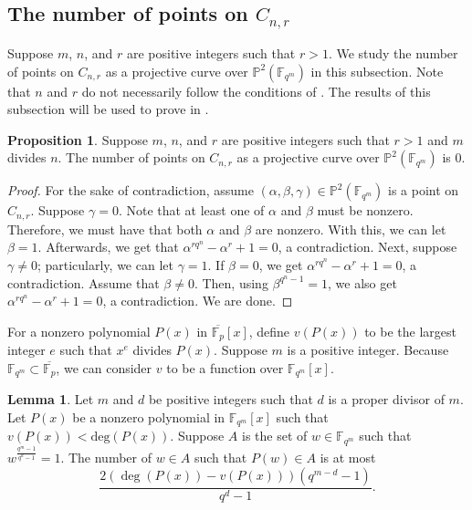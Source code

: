 \documentclass[12pt,letterpaper]{amsart}
\theoremstyle{definition}
\newtheorem{lemma}[theorem]{Lemma}
\newtheorem{proposition}[theorem]{Proposition}
\begin{document}
\subsection{The number of points on \texorpdfstring{$C_{n,r}$}{}}
\label{subsec:numpoints} 

Suppose $m$, $n$, and $r$ are positive integers such that $r>1$. We study the number of points on $C_{n,r}$ as a projective curve over $\mathbb{P}^2(\mathbb{F}_{q^m})$ in this subsection. Note that $n$ and $r$ do not necessarily follow the conditions of . The results of this subsection will be used to prove  in .

\begin{proposition}
\label{prop:numpoints1}
Suppose $m$, $n$, and $r$ are positive integers such that $r>1$ and $m$ divides $n$. The number of points on $C_{n,r}$ as a projective curve over $\mathbb{P}^2(\mathbb{F}_{q^m})$ is $0$.
\end{proposition}

\begin{proof}
For the sake of contradiction, assume $(\alpha,\beta,\gamma)\in \mathbb{P}^2(\mathbb{F}_{q^m})$ is a point on $C_{n,r}$. Suppose $\gamma=0$. Note that at least one of $\alpha$ and $\beta$ must be nonzero. Therefore, we must have that both $\alpha$ and $\beta$ are nonzero. With this, we can let $\beta=1$. Afterwards, we get that $\alpha^{rq^n}-\alpha^r+1=0$, a contradiction. Next, suppose $\gamma\not=0$; particularly, we can let $\gamma=1$. If $\beta=0$, we get $\alpha^{rq^n}-\alpha^r+1=0$, a contradiction. Assume that $\beta\not=0$. Then, using $\beta^{q^n-1}=1$, we also get $\alpha^{rq^n}-\alpha^r+1=0$, a contradiction. We are done.
\end{proof}

For a nonzero polynomial $P(x)$ in $\overline{\mathbb{F}_p}[x]$, define $v(P(x))$ to be the largest integer $e$ such that $x^e$ divides $P(x)$. Suppose $m$ is a positive integer. Because $\mathbb{F}_{q^m}\subset\overline{\mathbb{F}_p}$, we can consider $v$ to be a function over $\mathbb{F}_{q^m}[x]$.

\begin{lemma}
\label{lemma:polynumpoints}
Let $m$ and $d$ be positive integers such that $d$ is a proper divisor of $m$. Let $P(x)$ be a nonzero polynomial in $\mathbb{F}_{q^m}[x]$ such that $v(P(x))<\text{deg}(P(x))$. Suppose $A$ is the set of $w\in\mathbb{F}_{q^m}$ such that $w^{\frac{q^m-1}{q^d-1}}=1$. The number of $w\in A$ such that $P(w)\in A$ is at most 
\[
\frac{2(\deg(P(x))-v(P(x)))(q^{m-d}-1)}{q^d-1}.
\]
\end{lemma}
\end{document}
